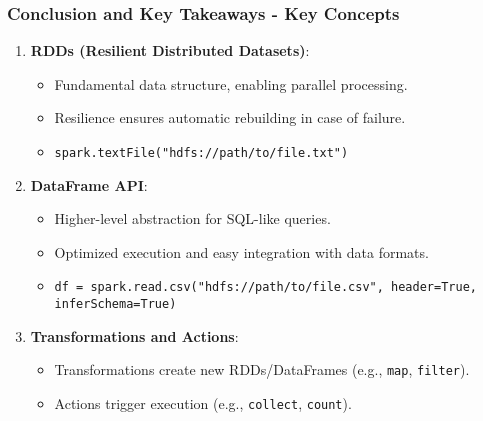 \documentclass[aspectratio=169]{beamer}
\begin{document}
\begin{frame}[fragile]
    \frametitle{Conclusion and Key Takeaways - Key Concepts}
    \begin{enumerate}
        \item \textbf{RDDs (Resilient Distributed Datasets)}:
            \begin{itemize}
                \item Fundamental data structure, enabling parallel processing.
                \item Resilience ensures automatic rebuilding in case of failure.
                \item \texttt{spark.textFile("hdfs://path/to/file.txt")}
            \end{itemize}
        
        \item \textbf{DataFrame API}:
            \begin{itemize}
                \item Higher-level abstraction for SQL-like queries.
                \item Optimized execution and easy integration with data formats.
                \item \texttt{df = spark.read.csv("hdfs://path/to/file.csv", header=True, inferSchema=True)}
            \end{itemize}
        
        \item \textbf{Transformations and Actions}:
            \begin{itemize}
                \item Transformations create new RDDs/DataFrames (e.g., \texttt{map}, \texttt{filter}).
                \item Actions trigger execution (e.g., \texttt{collect}, \texttt{count}).
            \end{itemize}
    \end{enumerate}
\end{frame}
\end{document}

